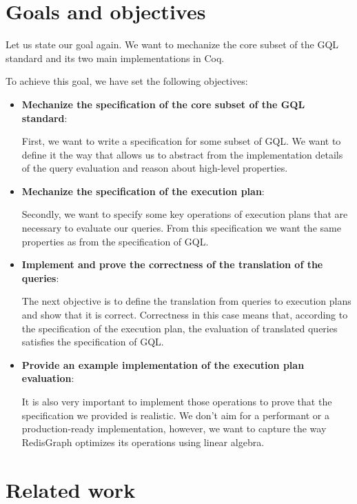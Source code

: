 \documentclass[14pt]{constructor-thesis}
\theoremstyle{definition}
\begin{document}
\section{Goals and objectives}

Let us state our goal again. We want to mechanize the core subset of the GQL standard and its two main implementations in Coq.

To achieve this goal, we have set the following objectives:
\begin{itemize}
  \item \textbf{Mechanize the specification of the core subset of the GQL standard}:
  
  First, we want to write a specification for some subset of GQL. We want to define it the way that allows us to abstract from the implementation details of the query evaluation and reason about high-level properties.

  \item \textbf{Mechanize the specification of the execution plan}:
  
  Secondly, we want to specify some key operations of execution plans that are necessary to evaluate our queries. From this specification we want the same properties as from the specification of GQL.

  \item \textbf{Implement and prove the correctness of the translation of the queries}:
  
  The next objective is to define the translation from queries to execution plans and show that it is correct. Correctness in this case means that, according to the specification of the execution plan, the evaluation of translated queries satisfies the specification of GQL.

  \item \textbf{Provide an example implementation of the execution plan evaluation}:
  
  It is also very important to implement those operations to prove that the specification we provided is realistic. We don't aim for a performant or a production-ready implementation, however, we want to capture the way RedisGraph optimizes its operations using linear algebra.

\end{itemize}

\section{Related work}
\end{document}
